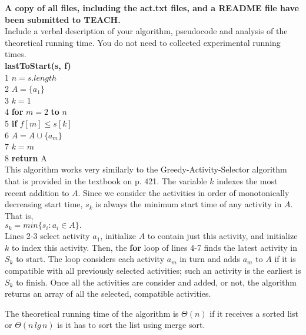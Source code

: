\documentclass{article}
\begin{document}
\noindent \textbf{A copy of all files, including the act.txt files, and a README file have been submitted to TEACH.}
\\[.25cm]
Include a verbal description of your algorithm, pseudocode and analysis of the theoretical running time. You do not need to collected experimental running times.
\\[.25cm]
\noindent \textbf{lastToStart(s, f)}\\
1 \quad $n = s.length$\\
2 \quad $A = \{a_1\}$\\
3 \quad $k = 1$\\
4 \quad \textbf{for} $m = 2$ \textbf{to} $n$\\
5 \qquad \textbf{if} $f[m] \leq s[k]$\\
6 \qquad\qquad $A = A \cup \{a_m\}$\\
7 \qquad\qquad $k = m$\\
8 \qquad \textbf{return} A
\\[.25cm]
This algorithm works very similarly to the Greedy-Activity-Selector algorithm that is provided in the textbook on p. 421. The variable $k$ indexes the most recent addition to $A$. Since we consider the activities in order of monotonically decreasing start time, $s_k$ is always the minimum start time of any activity in $A$. That is,
\\[.25cm]
\indent $s_k = min\{s_i : a_i \in A\}.$
\\[.25cm]
Lines 2-3 select activity $a_1$, initialize $A$ to contain just this activity, and initialize $k$ to index this activity. Then, the \textbf{for} loop of lines 4-7 finds the latest activity in $S_k$ to start. The loop considers each activity $a_m$ in turn and adds $a_m$ to $A$ if it is compatible with all previously selected activities; such an activity is the earliest is $S_k$ to finish. Once all the activities are consider and added, or not, the algorithm returns an array of all the selected, compatible activities. 

The theoretical running time of the algorithm is $\Theta (n)$ if it receives a sorted list or  $\Theta (n\, lg\, n)$ is it has to sort the list using merge sort. 
\\[.25cm]

    
\end{document}
